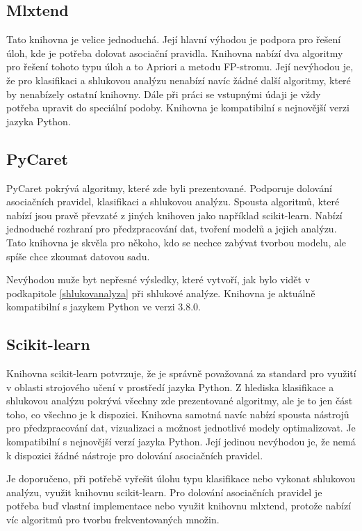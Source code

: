 \subsection*{Mlxtend}
Tato knihovna je velice jednoduchá. Její hlavní výhodou je podpora pro řešení úloh, kde je
potřeba dolovat asociační pravidla. Knihovna nabízí dva algoritmy pro řešení tohoto typu
úloh a to Apriori a metodu FP-stromu.
Její nevýhodou je, že pro klasifikaci a shlukovou analýzu nenabízí navíc žádné další
algoritmy, které by nenabízely ostatní knihovny. Dále při práci se vstupnými údaji je vždy potřeba upravit do speciální podoby. Knihovna je kompatibilní s nejnovější verzi jazyka Python.

\subsection*{PyCaret}
PyCaret pokrývá algoritmy, které zde byli prezentované. Podporuje dolování asociačních pravidel, klasifikaci a shlukovou analýzu. Spousta algoritmů, které nabízí jsou pravě převzaté z jiných knihoven jako například scikit-learn. Nabízí jednoduché rozhraní pro předzpracování dat, tvoření modelů a jejich analýzu. Tato knihovna je skvěla pro někoho, kdo se nechce zabývat tvorbou modelu, ale spíše chce zkoumat datovou sadu. 

Nevýhodou muže byt nepřesné výsledky, které vytvoří, jak bylo vidět v podkapitole \ref{shlukovanalyza} při shlukové analýze. Knihovna je aktuálně kompatibilní s jazykem Python ve verzi 3.8.0.
\subsection*{Scikit-learn}
Knihovna scikit-learn potvrzuje, že je správně považovaná za standard pro využití v oblasti strojového učení v prostředí jazyka Python. Z hlediska klasifikace a shlukovou analýzu pokrývá všechny zde prezentované algoritmy, ale je to jen část toho, co všechno je k dispozici. Knihovna samotná navíc nabízí spousta nástrojů pro předzpracování dat, vizualizaci a možnost jednotlivé modely optimalizovat. Je kompatibilní s nejnovější verzí jazyka Python.
Její jedinou nevýhodou je, že nemá k dispozici žádné nástroje pro dolování asociačních pravidel.


Je doporučeno, při potřebě vyřešit úlohu typu klasifikace nebo vykonat shlukovou analýzu, využit knihovnu scikit-learn. Pro dolování asociačních pravidel je potřeba buď vlastní implementace nebo využit knihovnu mlxtend, protože nabízí víc algoritmů pro tvorbu frekventovaných množin.

